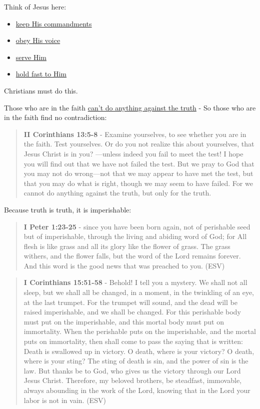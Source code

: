 \documentclass[11pt]{article}
\begin{document}
Think of Jesus here:
\begin{itemize}
\item \uline{keep His commandments}
\item \uline{obey His voice}
\item \uline{serve Him}
\item \uline{hold fast to Him}
\end{itemize}

Christians must do this.

Those who are in the faith \uline{can't do anything against the truth} - So those who are in the faith find no contradiction:

\begin{quote}
\textbf{II Corinthians 13:5-8} - Examine yourselves, to see whether you are in the faith. Test yourselves. Or do you not realize this about yourselves, that Jesus Christ is in you? —unless indeed you fail to meet the test! I hope you will find out that we have not failed the test. But we pray to God that you may not do wrong—not that we may appear to have met the test, but that you may do what is right, though we may seem to have failed. For we cannot do anything against the truth, but only for the truth.
\end{quote}

Because truth is truth, it is imperishable:

\begin{quote}
\textbf{I Peter 1:23-25} - since you have been born again, not of perishable seed but of imperishable, through the living and abiding word of God; for All flesh is like grass and all its glory like the flower of grass. The grass withers, and the flower falls, but the word of the Lord remains forever. And this word is the good news that was preached to you. (ESV)
\end{quote}

\begin{quote}
\textbf{I Corinthians 15:51-58} - Behold! I tell you a mystery. We shall not all sleep, but we shall all be changed, in a moment, in the twinkling of an eye, at the last trumpet. For the trumpet will sound, and the dead will be raised imperishable, and we shall be changed. For this perishable body must put on the imperishable, and this mortal body must put on immortality. When the perishable puts on the imperishable, and the mortal puts on immortality, then shall come to pass the saying that is written: Death is swallowed up in victory. O death, where is your victory? O death, where is your sting? The sting of death is sin, and the power of sin is the law. But thanks be to God, who gives us the victory through our Lord Jesus Christ. Therefore, my beloved brothers, be steadfast, immovable, always abounding in the work of the Lord, knowing that in the Lord your labor is not in vain. (ESV)
\end{quote}
\end{document}
